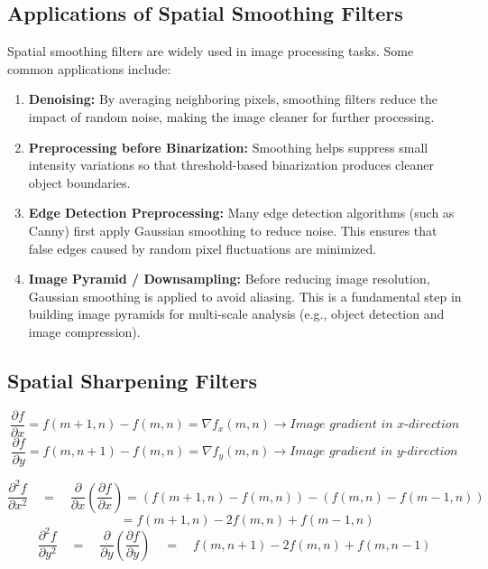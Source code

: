 \subsection{Applications of Spatial Smoothing Filters}
Spatial smoothing filters are widely used in image processing tasks. 
Some common applications include:
\begin{enumerate}
    \item \textbf{Denoising:} 
    By averaging neighboring pixels, smoothing filters reduce the impact 
    of random noise, making the image cleaner for further processing.

    \item \textbf{Preprocessing before Binarization:} 
    Smoothing helps suppress small intensity variations so that threshold-based 
    binarization produces cleaner object boundaries.

    \item \textbf{Edge Detection Preprocessing:} 
    Many edge detection algorithms (such as Canny) first apply Gaussian smoothing 
    to reduce noise. This ensures that false edges caused by random pixel fluctuations 
    are minimized.

    \item \textbf{Image Pyramid / Downsampling:} 
    Before reducing image resolution, Gaussian smoothing is applied to avoid aliasing. 
    This is a fundamental step in building image pyramids for multi-scale analysis 
    (e.g., object detection and image compression).
\end{enumerate}

\subsection{Spatial Sharpening Filters}
\[
\frac{\partial f}{\partial x} = f(m+1,n) - f(m,n) = \nabla f_x(m,n) \rightarrow \textit{Image gradient in x-direction}
\]
\[
\frac{\partial f}{\partial y} = f(m,n+1) - f(m,n)=\nabla f_y(m,n) \rightarrow \textit{Image gradient in y-direction}
\]

\[
\frac{\partial^2 f}{\partial x^2} 
\quad=\quad \frac{\partial}{\partial x}\!\left(\frac{\partial f}{\partial x}\right) 
= (f(m+1,n) - f(m,n)) - (f(m,n) - f(m-1,n)) 
\]
\[
\quad\quad= f(m+1,n) - 2f(m,n) + f(m-1,n)
\]
\[
\frac{\partial^2 f}{\partial y^2} 
\quad=\quad \frac{\partial}{\partial y}\!\left(\frac{\partial f}{\partial y}\right) 
\quad=\quad  f(m,n+1) - 2f(m,n) + f(m,n-1)
\]

